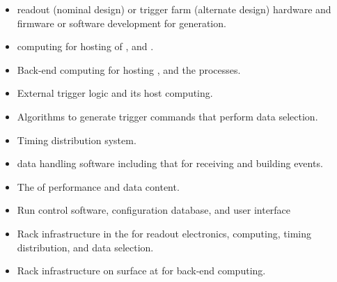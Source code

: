 \begin{itemize}
\item {} readout (nominal design) or trigger farm (alternate
  design) hardware and firmware or software development for
   generation.
\item {} computing for hosting of ,  and .
\item Back-end computing for hosting ,  and the  processes.
\item External trigger logic and its host computing.
\item Algorithms to generate trigger commands that perform data selection.
\item Timing distribution system.
\item {} data handling software including that for receiving and building 
  events.
\item The  of  performance and data content.
\item Run control software, configuration database, and user interface
\item Rack infrastructure in the  for readout
  electronics,  computing, timing distribution, and data
  selection.
\item Rack infrastructure on surface at \surf for back-end computing.
\end{itemize}
